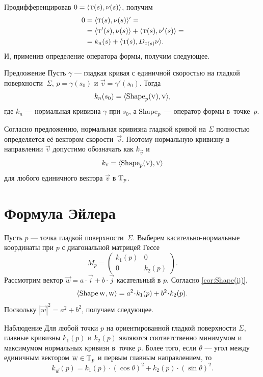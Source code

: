 Продифференцировав $0=\langle \text{\sc{t}}(s),\nu(s)\rangle$, получим
\begin{align*}
0&=\langle \text{\sc{t}}(s),\nu(s)\rangle'=
\\
&=\langle \text{\sc{t}}'(s),\nu(s)\rangle+\langle \text{\sc{t}}(s),\nu'(s)\rangle=
\\
&=k_n(s)+\langle \text{\sc{t}}(s),D_{\text{\sc{t}}(s)}\nu\rangle.
\end{align*}
И, применив определение оператора формы,
получим следующее.

\begin{thm}{Предложение}\label{prop:normal-shape}
Пусть $\gamma$ --- гладкая кривая с единичной скоростью на гладкой поверхности~$\Sigma$, $p=\gamma(s_0)$ и $\vec v=\gamma'(s_0)$.
Тогда 
\[k_n(s_0)=\langle \mathop{\rm Shape}\nolimits_p(\text{\sc{v}}),\text{\sc{v}}\rangle,\]
где $k_n$ --- нормальная кривизна $\gamma$ при $s_0$, а $\mathop{\rm Shape}\nolimits_p$ --- оператор формы в~точке~$p$.
\end{thm}

Согласно предложению, нормальная кривизна гладкой кривой на $\Sigma$ полностью определяется её вектором скорости~$\vec v$.
Поэтому нормальную кривизну в направлении $\vec v$ допустимо обозначать как $k_{\vec v}$ и
\[k_{\text{\sc{v}}}=\langle \mathop{\rm Shape}\nolimits_p(\text{\sc{v}}),\text{\sc{v}}\rangle\]
для любого единичного вектора $\vec v$ в $\mathrm{T}_p$.


\section{Формула Эйлера}

Пусть $p$ --- точка гладкой поверхности~$\Sigma$.
Выберем касательно-нормальные координаты при $p$ с диагональной матрицей Гессе
\[M_p=\begin{pmatrix}
 k_1(p)
 &0
 \\
 0
 &k_2(p)
 \end{pmatrix}.
\]
Рассмотрим вектор ${\vec w}=a\cdot\vec i+b\cdot\vec j$ касательный в $p$.
Согласно \ref{cor:Shape(ij)},
\[
\langle \Shape\vec w,\vec w\rangle
=a^2\cdot k_1(p) +b^2\cdot k_2(p). 
\]
Поскольку $|{\vec w}|^2=a^2+b^2$, получаем следующее.

\begin{thm}{Наблюдение}\label{obs:k1-k2}
Для любой точки $p$ на ориентированной гладкой поверхности $\Sigma$,
главные кривизны $k_1(p)$ и $k_2(p)$ являются соответственно минимумом и максимумом нормальных кривизн в~точке $p$.
Более того, если $\theta$ --- угол между единичным вектором ${\text{\sc{w}}}\in\mathrm{T}_p$ и первым главным направлением, то 
\[k_{\vec w}(p)=k_1(p)\cdot(\cos\theta)^2+k_2(p)\cdot(\sin\theta)^2.\]

\end{thm}

